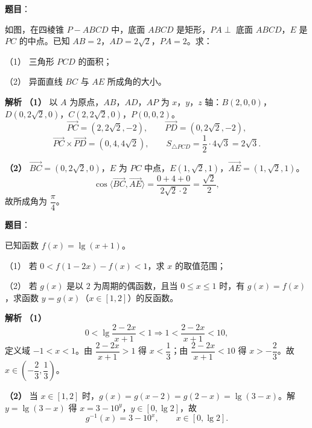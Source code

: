 \begin{answer}

\textbf{题目}：

如图，在四棱锥 $P-ABCD$ 中，底面 $ABCD$ 是矩形，$PA\perp$ 底面 $ABCD$，$E$ 是 $PC$ 的中点。已知 $AB=2$，$AD=2\sqrt2$，$PA=2$。求：

（1） 三角形 $PCD$ 的面积；

（2） 异面直线 $BC$ 与 $AE$ 所成角的大小。
\nopagebreak[4]
\begin{center}\end{center}
\nopagebreak[4]
\textbf{解析}
\textbf{（1）} 以 $A$ 为原点，$AB$，$AD$，$AP$ 为 $x$，$y$，$z$ 轴：$B(2,0,0)$，$D(0,2\sqrt2,0)$，$C(2,2\sqrt2,0)$，$P(0,0,2)$。
\nopagebreak[4]
\[\overrightarrow{PC}=(2,2\sqrt2,-2),\qquad\overrightarrow{PD}=(0,2\sqrt2,-2),\]
\nopagebreak[4]
\[\overrightarrow{PC}\times\overrightarrow{PD}=(0,4,4\sqrt2),\qquad S_{\triangle PCD}=\frac12\cdot4\sqrt3=2\sqrt3.\]

\textbf{（2）} $\overrightarrow{BC}=(0,2\sqrt2,0)$，$E$ 为 $PC$ 中点，$E(1,\sqrt2,1)$，$\overrightarrow{AE}=(1,\sqrt2,1)$。
\nopagebreak[4]
\[\cos\langle\overrightarrow{BC},\overrightarrow{AE}\rangle=\frac{0+4+0}{2\sqrt2\cdot2}=\frac{\sqrt2}2,\]
故所成角为 $\dfrac\pi4$。



\end{answer}
\begin{answer}

\textbf{题目}：

已知函数 $f(x)=\lg(x+1)$。

（1） 若 $0<f(1-2x)-f(x)<1$，求 $x$ 的取值范围；

（2） 若 $g(x)$ 是以 $2$ 为周期的偶函数，且当 $0\leqslant x\leqslant1$ 时，有 $g(x)=f(x)$，求函数 $y=g(x)$（$x\in[1,2]$）的反函数。

\textbf{解析}
\textbf{（1）}
\nopagebreak[4]
\[0<\lg\frac{2-2x}{x+1}<1\Longrightarrow1<\frac{2-2x}{x+1}<10,\]
定义域 $-1<x<1$。由 $\dfrac{2-2x}{x+1}>1$ 得 $x<\dfrac13$；由 $\dfrac{2-2x}{x+1}<10$ 得 $x>-\dfrac23$。故 $x\in\left(-\dfrac23,\dfrac13\right)$。

\textbf{（2）} 当 $x\in[1,2]$ 时，$g(x)=g(x-2)=g(2-x)=\lg(3-x)$。解 $y=\lg(3-x)$ 得 $x=3-10^y$，$y\in[0,\lg2]$，故
\nopagebreak[4]
\[g^{-1}(x)=3-10^x,\qquad x\in[0,\lg2].\]



\end{answer}
